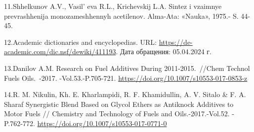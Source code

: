 \begin{references}
11.Shhelkunov A.V., Vasil' eva R.L., Krichevskij L.A.
Sintez i vzaimnye prevrashhenija monozameshhennyh acetilenov. Alma-Ata:
«Nauka», 1975.- S. 44-45.

12.Academic dictionaries and encyclopedias. URL:
\url{https://de-academic.com/dic.nsf/dewiki/411193}. Дата обращения:
05.04.2024 г.

13.Danilov A.M. Research on Fuel Additives During 2011-2015.~//Chem
Technol Fuels Oils.~-2017. -Vol.53.-P.705-721.
\url{https://doi.org/10.1007/s10553-017-0853-z}

14.R. M. Nikulin, Kh. E. Kharlampidi, R. F. Khamidullin, A. V. Sitalo \&
F. A. Sharaf Synergistic Blend Based on Glycol Ethers as Antiknock
Additives to Motor Fuels // Chemistry and Technology of Fuels and
Oils.-2017.-Vol.52. - P.762-772.
\url{https://doi.org/10.1007/s10553-017-0771-0}
\end{references}

